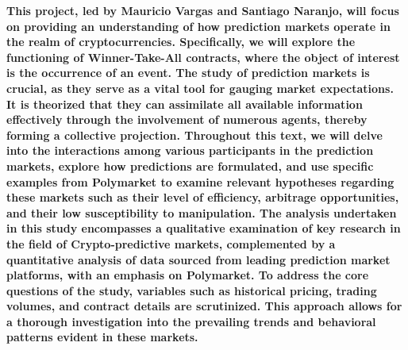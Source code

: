 {\bfseries
	This project, led by Mauricio Vargas and Santiago Naranjo, will focus on providing an understanding of how prediction markets operate in the realm of cryptocurrencies. Specifically, we will explore the functioning of Winner-Take-All contracts, where the object of interest is the occurrence of an event. The study of prediction markets is crucial, as they serve as a vital tool for gauging market expectations. It is theorized that they can assimilate all available information effectively through the involvement of numerous agents, thereby forming a collective projection. Throughout this text, we will delve into the interactions among various participants in the prediction markets, explore how predictions are formulated, and use specific examples from Polymarket to examine relevant hypotheses regarding these markets such as their level of efficiency, arbitrage opportunities, and their low susceptibility to manipulation.
	The analysis undertaken in this study encompasses a qualitative examination of key research in the field of Crypto-predictive markets, complemented by a quantitative analysis of data sourced from leading prediction market platforms, with an emphasis on Polymarket. To address the core questions of the study, variables such as historical pricing, trading volumes, and contract details are scrutinized. This approach allows for a thorough investigation into the prevailing trends and behavioral patterns evident in these markets.
}\par
